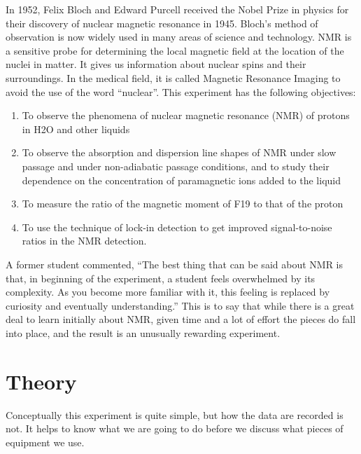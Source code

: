 \documentclass{../lab}
\begin{document}
In 1952, Felix Bloch and Edward Purcell received the Nobel Prize in physics for their discovery of nuclear magnetic resonance in 1945. Bloch's method of observation is now widely used in many areas of science and technology. NMR is a sensitive probe for determining the local magnetic field at the location of the nuclei in matter. It gives us information about nuclear spins and their surroundings. In the medical field, it is called Magnetic Resonance Imaging to avoid the use of the word ``nuclear''. This experiment has the following objectives:

\begin{enumerate}
    \item To observe the phenomena of nuclear magnetic resonance (NMR) of protons in H2O and other liquids

    \item To observe the absorption and dispersion line shapes of NMR under slow passage and under non-adiabatic passage conditions, and to study their dependence on the concentration of paramagnetic ions added to the liquid

    \item To measure the ratio of the magnetic moment of F19 to that of the proton

    \item To use the technique of lock-in detection to get improved signal-to-noise ratios in the NMR detection.

\end{enumerate}

A former student commented, ``The best thing that can be said about NMR is that, in beginning of the experiment, a student feels overwhelmed by its complexity. As you become more familiar with it, this feeling is replaced by curiosity and eventually understanding.'' This is to say that while there is a great deal to learn initially about NMR, given time and a lot of effort the pieces do fall into place, and the result is an unusually rewarding experiment.

\section{Theory}

Conceptually this experiment is quite simple, but how the data are recorded is not. It helps to know what we are going to do before we discuss what pieces of equipment we use.
\end{document}
